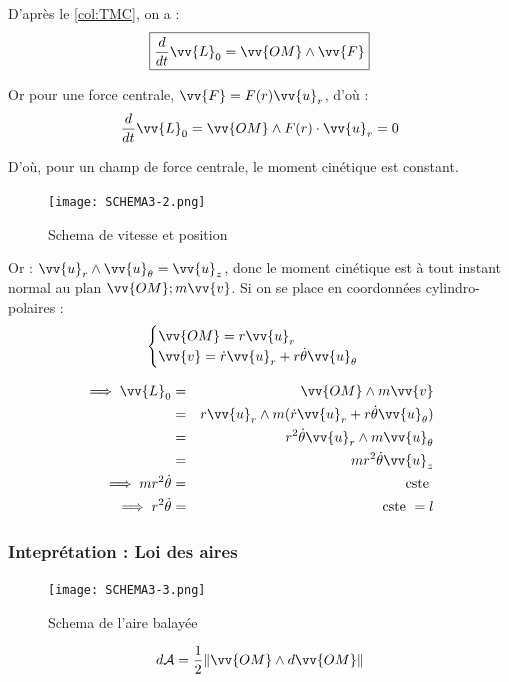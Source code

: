 D'après le \autoref{col:TMC}, on a :
\[
    \boxed{\frac{d}{dt}\vv{L}_{0} = \vv{OM} \wedge \vv{F}}
\]

Or pour une force centrale, \(\vv{F} = F(r) \vv{u}_{r}\), d'où : 
\[
    \frac{d}{dt}\vv{L}_{0} = \vv{OM} \wedge F(r) \cdot \vv{u}_{r} = 0 
\] 

D'où, pour un champ de force centrale, le moment cinétique est constant. \par

\begin{figure}[!htb]
    \centering
    \texttt{[image: SCHEMA3-2.png]}
    \caption{Schema de vitesse et position}
    \label{fig:SCHEMA3-2}
\end{figure}



Or : \(\vv{u}_{r} \wedge  \vv{u}_{\theta} = \vv{u}_{z}\), donc le moment cinétique est à tout instant normal au plan \(\vv{OM}; m\vv{v}\). Si on se place en coordonnées cylindro-polaires :
\[
    \begin{cases}
        \vv{OM} = r\vv{u}_{r}\\
        \vv{v} = \dot{r}\vv{u}_{r} + r \dot{\theta} \vv{u}_{\theta}
    \end{cases}
\]
   
\begin{eqnarray*}
    \implies \vv{L}_{0} &=& \vv{OM} \wedge m\vv{v} \\
    &=& r\vv{u}_{r} \wedge m(\dot{r}\vv{u}_{r} + r \dot{\theta} \vv{u}_{\theta}) \\
    &=& r^{2}\dot{\theta} \vv{u}_{r} \wedge  m\vv{u}_{\theta} \\
    &=& mr^{2}\dot{\theta} \vv{u}_{z}\\
    \implies mr^{2}\dot{\theta} &=& \text{cste } \\
    \implies r^{2}\dot{\theta} &=& \text{cste } = l
\end{eqnarray*}

\subsubsection{Inteprétation : Loi des aires}

\begin{figure}[!htb]
    \centering
    \texttt{[image: SCHEMA3-3.png]}
    \caption{Schema de l'aire balayée}
    \label{fig:SCHEMA3-3}
\end{figure}



\[
    d \mathcal{A} = \frac{1}{2}\lVert \vv{OM} \wedge d \vv{OM} \rVert 
\]

